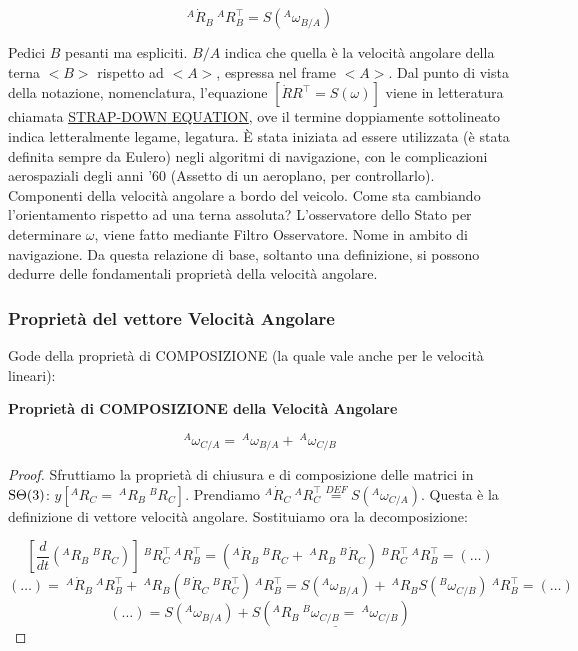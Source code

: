 \[
	^A\dot{R}_B\ ^AR_B^\top = S({^A}\omega_{B/A})
\]

Pedici $B$ pesanti ma espliciti. $B/A$ indica che quella è la velocità angolare della terna $<B>$ rispetto ad $<A>$, espressa nel frame $<A>$. Dal punto di vista della notazione, nomenclatura, l'equazione $[\dot{R}R^\top = S(\omega)]$ viene in letteratura chiamata \underline{\underline{STRAP-DOWN} EQUATION}, ove il termine doppiamente sottolineato indica letteralmente legame, legatura. \`E stata iniziata ad essere utilizzata (è stata definita sempre da Eulero) negli algoritmi di navigazione, con le complicazioni aerospaziali degli anni '60 (Assetto di un aeroplano, per controllarlo). Componenti della velocità angolare a bordo del veicolo. Come sta cambiando l'orientamento rispetto ad una terna assoluta? L'osservatore dello Stato per determinare $\omega$, viene fatto mediante Filtro Osservatore. Nome in ambito di navigazione. Da questa relazione di base, soltanto una definizione, si possono dedurre delle fondamentali proprietà della velocità angolare.

\subsubsection{Proprietà del vettore Velocità Angolare}

Gode della proprietà di COMPOSIZIONE (la quale vale anche per le velocità lineari):

\begin{thrm}{\textbf{Proprietà di COMPOSIZIONE della Velocità Angolare}}

\[
	^A\omega_{C/A} =\ ^A\omega_{B/A} +\ ^A\omega_{C/B}
\]

\end{thrm}

\begin{proof}

Sfruttiamo la proprietà di chiusura e di composizione delle matrici in $\operatorname{S\Theta}(3)$: $y[{^A}R_C =\ ^AR_B\ ^BR_C]$. Prendiamo $^A\dot{R}_C\ ^AR_C^\top \stackrel{DEF}{=} S({^A}\omega_{C/A})$. Questa è la definizione di vettore velocità angolare. Sostituiamo ora la decomposizione:

\[
	[\frac{d}{dt}({^A}R_B\ ^BR_C)]\ ^BR_C^\top\ ^AR_B^\top = ({^A}\dot{R}_B\ ^BR_C +\ ^AR_B\ ^B\dot{R}_C)\ ^BR_C^\top\ ^AR_B^\top = (\dots)
\]
\[
	(\dots) =\ ^A\dot{R}_B\ ^AR_B^\top +\ ^AR_B({^B}\dot{R}_C\ ^BR_C^\top)\ ^AR_B^\top = S(^A\omega_{B/A}) +\ ^AR_BS(^B\omega_{C/B})\ ^AR_B^\top = (\dots)
\]
\[
	(\dots) = S(^A\omega_{B/A}) + S(\underline{^AR_B\ ^B\omega_{C/B} =\ ^A\omega_{C/B}})
\]

\end{proof}

